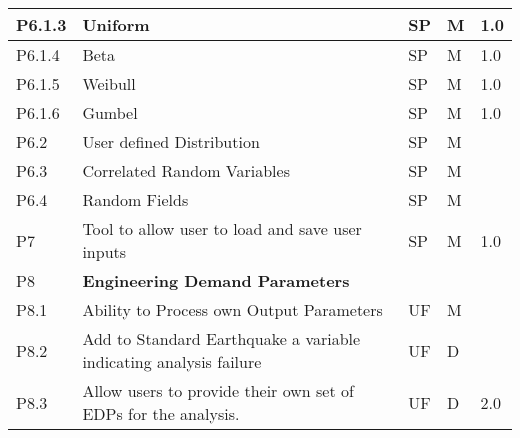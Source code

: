 \begin{longtable}{| p{} | p{} | p{} | p{} |  p{} |}
    P6.1.3 & Uniform & SP & M & 1.0  \\ \hline
    P6.1.4 & Beta & SP & M & 1.0 \\ \hline
    P6.1.5 & Weibull &  SP & M  & 1.0 \\ \hline
    P6.1.6 & Gumbel &  SP & M & 1.0  \\ \hline
    P6.2 & User defined Distribution & SP & M &  \\ \hline
    P6.3 & Correlated Random Variables & SP & M &  \\ \hline
    P6.4 & Random Fields & SP & M &  \\ \hline
     P7 & Tool to allow user to load and save user inputs & SP & M & 1.0 \\ \hhline{=====}
    P8 & \textbf{Engineering Demand Parameters} &  &  & \\ \hline
    P8.1 & Ability to Process own Output Parameters & UF & M &   \\ \hline
    P8.2 & Add to Standard Earthquake a variable indicating analysis failure & UF & D &   \\ \hline
    P8.3 & Allow users to provide their own set of EDPs for the analysis. & UF & D & 2.0\\ \hline


\end{longtable}
